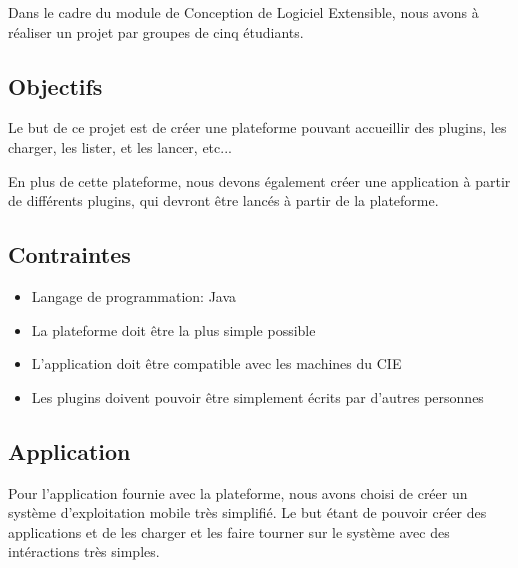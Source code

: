 Dans le cadre du module de Conception de Logiciel Extensible, nous avons à réaliser un projet par groupes de cinq étudiants.

\subsection{Objectifs}

Le but de ce projet est de créer une plateforme pouvant accueillir des plugins, les charger, les lister, et les lancer, etc...

En plus de cette plateforme, nous devons également créer une application à partir de différents plugins, qui devront être lancés à partir de la plateforme.

\subsection{Contraintes}

\begin{itemize}

\item Langage de programmation: Java
\item La plateforme doit être la plus simple possible
\item L'application doit être compatible avec les machines du CIE
\item Les plugins doivent pouvoir être simplement écrits par d'autres personnes

\end{itemize}

\subsection{Application}

Pour l'application fournie avec la plateforme, nous avons choisi de créer un système d'exploitation mobile très simplifié. Le but étant de pouvoir créer des applications et de les charger et les faire tourner sur le système avec des intéractions très simples.
